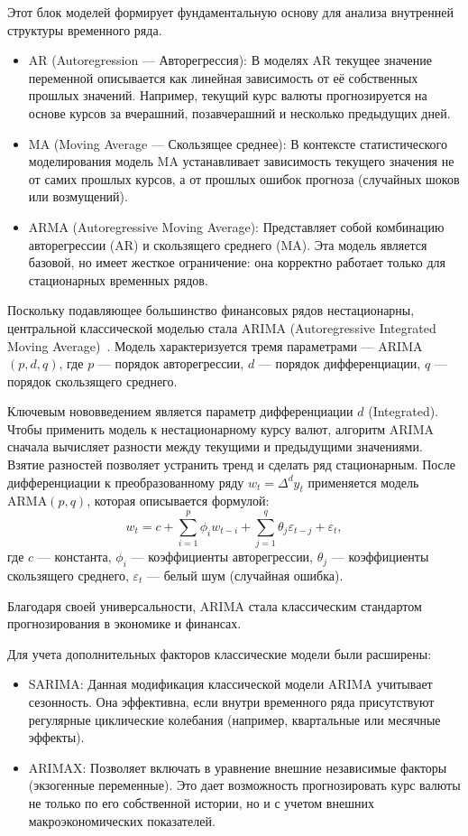 Этот блок моделей формирует фундаментальную основу для анализа внутренней структуры временного ряда.
\begin{itemize}
    \item AR (Autoregression — Авторегрессия): В моделях AR текущее значение переменной описывается как линейная зависимость от её собственных прошлых значений. Например, текущий курс валюты прогнозируется на основе курсов за вчерашний, позавчерашний и несколько предыдущих дней.
    \item MA (Moving Average — Скользящее среднее): В контексте статистического моделирования модель MA устанавливает зависимость текущего значения не от самих прошлых курсов, а от прошлых ошибок прогноза (случайных шоков или возмущений).
    \item ARMA (Autoregressive Moving Average): Представляет собой комбинацию авторегрессии (AR) и скользящего среднего (MA). Эта модель является базовой, но имеет жесткое ограничение: она корректно работает только для стационарных временных рядов.
\end{itemize}

\sloppy
Поскольку подавляющее большинство финансовых рядов нестационарны, центральной классической моделью стала ARIMA (Autoregressive Integrated Moving Average)~\cite{box2016}. Модель характеризуется тремя параметрами — ARIMA$(p, d, q)$, где $p$ — порядок авторегрессии, $d$ — порядок дифференциации, $q$ — порядок скользящего среднего.

\sloppy
Ключевым нововведением является параметр дифференциации $d$ (Integrated). Чтобы применить модель к нестационарному курсу валют, алгоритм ARIMA сначала вычисляет разности между текущими и предыдущими значениями. Взятие разностей позволяет устранить тренд и сделать ряд стационарным. После дифференциации к преобразованному ряду $w_t = \Delta^d y_t$ применяется модель ARMA$(p,q)$, которая описывается формулой:
$$w_t = c + \sum_{i=1}^{p} \phi_i w_{t-i} + \sum_{j=1}^{q} \theta_j \varepsilon_{t-j} + \varepsilon_t,$$
где $c$ — константа, $\phi_i$ — коэффициенты авторегрессии, $\theta_j$ — коэффициенты скользящего среднего, $\varepsilon_t$ — белый шум (случайная ошибка).

Благодаря своей универсальности, ARIMA стала классическим стандартом прогнозирования в экономике и финансах.

Для учета дополнительных факторов классические модели были расширены:
\begin{itemize}
    \item SARIMA: Данная модификация классической модели ARIMA учитывает сезонность. Она эффективна, если внутри временного ряда присутствуют регулярные циклические колебания (например, квартальные или месячные эффекты).
    \item ARIMAX: Позволяет включать в уравнение внешние независимые факторы (экзогенные переменные). Это дает возможность прогнозировать курс валюты не только по его собственной истории, но и с учетом внешних макроэкономических показателей.
\end{itemize}


